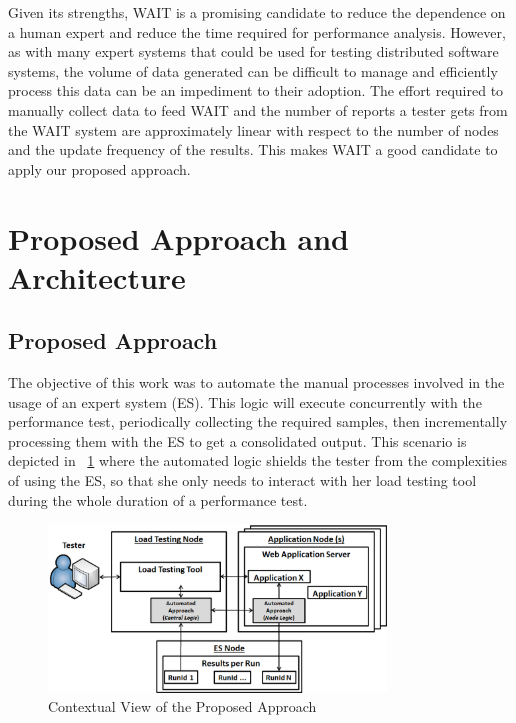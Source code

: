 \documentclass[runningheads,a4paper]{llncs}
\begin{document}
Given its strengths, WAIT is a promising candidate to reduce the
dependence on a human expert and reduce the time required for performance 
analysis. However, as with many expert systems that could be used for testing 
distributed software systems, the volume of data generated can be difficult to 
manage and efficiently process this data can be an impediment to their
adoption. The effort required to manually collect data to feed WAIT and the number 
of reports a tester gets from the WAIT system are approximately linear with
respect to the number of nodes and the update frequency of the results. This makes 
WAIT a good candidate to apply our proposed approach.


\vspace{-7pt}
\section{Proposed Approach and Architecture}
\label{ProposedApproach}
\vspace{-7pt}

\subsection{Proposed Approach}
\vspace{-7pt}
The objective of this work was to automate the manual processes involved
in the usage of an expert system (ES). This logic will execute concurrently with
the performance test, periodically collecting the required samples, then
incrementally processing them with the ES to get a consolidated
output. This scenario is depicted in \figurename ~\ref{fig_Overview} where the
automated logic shields the tester from the complexities of using the ES, so
that she only needs to interact with her load testing tool during the whole duration 
of a performance test.

\begin{figure}[!h]
\centering
\includegraphics[totalheight=.18\textheight,width=0.8\textwidth]{architecture_dwait}
\caption{Contextual View of the Proposed Approach}
\label{fig_Overview}
\end{figure}
\end{document}
